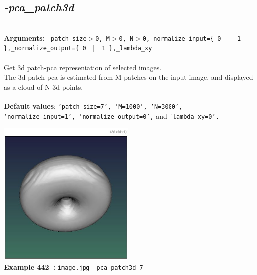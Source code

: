 \documentclass[a4paper,11pt,twoside]{book}
\begin{document}
\subsection{\emph{-pca\_patch3d} }\vspace*{-0.5em}
~\\\textbf{Arguments: } 
{\small \texttt{\_patch\_size$>$0,\_M$>$0,\_N$>$0,\_normalize\_input=\{ 0 ~$|$~ 1 \},\_normalize\_output=\{ 0 ~$|$~ 1 \},\_lambda\_xy}}\\~\\
Get 3d patch-pca representation of selected images.
~\\The 3d patch-pca is estimated from M patches on the input image, and displayed as a cloud of N 3d points.
~\\~\\\textbf{Default values}: {\small \texttt{'patch\_size=7', 'M=1000', 'N=3000', 'normalize\_input=1', 'normalize\_output=0',} and \texttt{'lambda\_xy=0'.}}
\begin{center}\includegraphics[keepaspectratio=true,height=7cm,width=\textwidth]{img/gmic_def442.jpg}\\
{\footnotesize \textbf{Example 442~:} \texttt{image.jpg -pca\_patch3d 7}}
\end{center}
\end{document}
